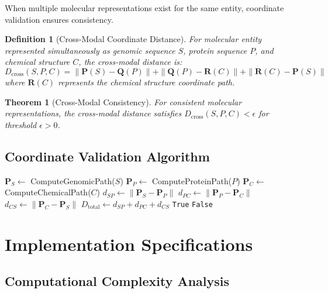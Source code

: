 \documentclass[12pt,a4paper]{article}
\newtheorem{theorem}{Theorem}
\newtheorem{definition}{Definition}
\begin{document}
When multiple molecular representations exist for the same entity, coordinate validation ensures consistency.

\begin{definition}[Cross-Modal Coordinate Distance]
For molecular entity represented simultaneously as genomic sequence $S$, protein sequence $P$, and chemical structure $C$, the cross-modal distance is:
$$D_{\text{cross}}(S,P,C) = \|\mathbf{P}(S) - \mathbf{Q}(P)\| + \|\mathbf{Q}(P) - \mathbf{R}(C)\| + \|\mathbf{R}(C) - \mathbf{P}(S)\|$$
where $\mathbf{R}(C)$ represents the chemical structure coordinate path.
\end{definition}

\begin{theorem}[Cross-Modal Consistency]
For consistent molecular representations, the cross-modal distance satisfies $D_{\text{cross}}(S,P,C) < \epsilon$ for threshold $\epsilon > 0$.
\end{theorem}

\subsection{Coordinate Validation Algorithm}

\begin{algorithm}[H]
\caption{Cross-Modal Coordinate Validation}
\begin{algorithmic}[1]
    \State $\mathbf{P}_S \gets$ ComputeGenomicPath($S$)
    \State $\mathbf{P}_P \gets$ ComputeProteinPath($P$)
    \State $\mathbf{P}_C \gets$ ComputeChemicalPath($C$)
    \State $d_{SP} \gets \|\mathbf{P}_S - \mathbf{P}_P\|$
    \State $d_{PC} \gets \|\mathbf{P}_P - \mathbf{P}_C\|$
    \State $d_{CS} \gets \|\mathbf{P}_C - \mathbf{P}_S\|$
    \State $D_{\text{total}} \gets d_{SP} + d_{PC} + d_{CS}$
        \State \Return \texttt{True}
    \Else
        \State \Return \texttt{False}
    \EndIf
\EndProcedure
\end{algorithmic}
\end{algorithm}

\section{Implementation Specifications}

\subsection{Computational Complexity Analysis}
\end{document}

